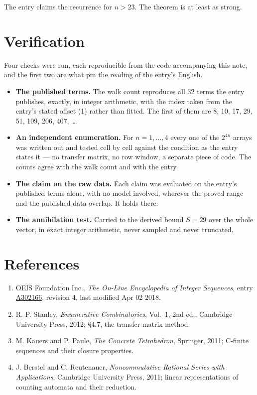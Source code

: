 \documentclass[11pt]{article}
\theoremstyle{definition}
\begin{document}
The entry claims the recurrence for $n > 23$. The theorem is at least as strong.

\section{Verification}

Four checks were run, each reproducible from the code accompanying this note, and the first two are what pin the reading of the entry's English.

\begin{itemize}

\item {\bfseries The published terms.} The walk count reproduces all 32 terms the entry publishes, exactly, in integer arithmetic, with the index taken from the entry's stated offset (1) rather than fitted. The first of them are 8, 10, 17, 29, 51, 109, 206, 407,~\dots

\item {\bfseries An independent enumeration.} For $n = 1,\dots,4$ every one of the $2^{4n}$ arrays was written out and tested cell by cell against the condition as the entry states it --- no transfer matrix, no row window, a separate piece of code. The counts agree with the walk count and with the entry.

\item {\bfseries The claim on the raw data.} Each claim was evaluated on the entry's published terms alone, with no model involved, wherever the proved range and the published data overlap. It holds there.

\item {\bfseries The annihilation test.} Carried to the derived bound $S = 29$ over the whole vector, in exact integer arithmetic, never sampled and never truncated.

\end{itemize}

\section{References}

\begin{enumerate}

\item OEIS Foundation Inc., \emph{The On-Line Encyclopedia of Integer Sequences}, entry \href{https://oeis.org/A302166}{A302166}, revision 4, last modified Apr 02 2018.

\item R. P. Stanley, \emph{Enumerative Combinatorics}, Vol.~1, 2nd ed., Cambridge University Press, 2012; \S4.7, the transfer-matrix method.

\item M. Kauers and P. Paule, \emph{The Concrete Tetrahedron}, Springer, 2011; C-finite sequences and their closure properties.

\item J. Berstel and C. Reutenauer, \emph{Noncommutative Rational Series with Applications}, Cambridge University Press, 2011; linear representations of counting automata and their reduction.

\end{enumerate}
\end{document}
